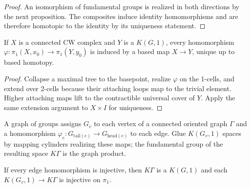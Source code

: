 \begin{proof}
\sketch An isomorphism of fundamental groups is realized in both directions by
the next proposition. The composites induce identity homomorphisms and are
therefore homotopic to the identity by its uniqueness statement.
\end{proof}

\begin{proposition}
\label{prop:homomorphism-to-kg1-realized-by-map}

If $X$ is a connected CW complex and $Y$ is a $K(G,1)$, every homomorphism
$\varphi:\pi_1(X,x_0)\to\pi_1(Y,y_0)$ is induced by a based map $X\to Y$,
unique up to based homotopy.
\end{proposition}

\begin{proof}
\sketch Collapse a maximal tree to the basepoint, realize $\varphi$ on the
1-cells, and extend over 2-cells because their attaching loops map to the
trivial element. Higher attaching maps lift to the contractible universal
cover of $Y$. Apply the same extension argument to $X\times I$ for uniqueness.
\end{proof}

\begin{definition}
\label{def:graph-of-groups}



A graph of groups assigns $G_v$ to each vertex of a connected oriented graph
$\Gamma$ and a homomorphism $\varphi_e:G_{\mathrm{tail}(e)}\to
G_{\mathrm{head}(e)}$ to each edge. Glue $K(G_v,1)$ spaces by mapping
cylinders realizing these maps; the fundamental group of the resulting space
$K\Gamma$ is the graph product.
\end{definition}

\begin{theorem}
\label{thm:graph-of-groups-is-kg1}

If every edge homomorphism is injective, then $K\Gamma$ is a $K(G,1)$ and each
$K(G_v,1)\to K\Gamma$ is injective on $\pi_1$.
\end{theorem}

